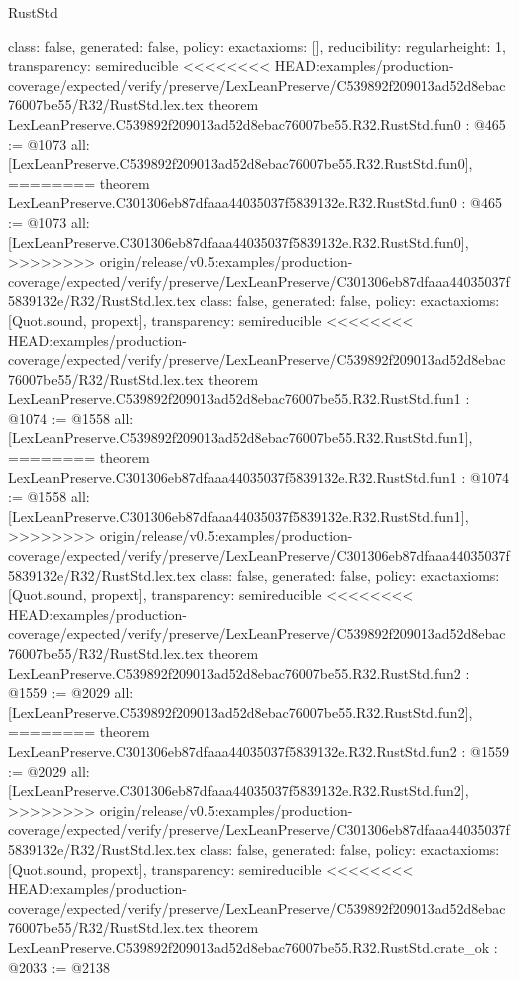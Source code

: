 \begin{lexlean}{RustStd}
\begin{coremodule}
{\begin{coremodule}
{{{  class: false,
  generated: false,
  policy: exact{axioms: []},
  reducibility: regular{height: 1},
  transparency: semireducible
}
<<<<<<<< HEAD:examples/production-coverage/expected/verify/preserve/LexLeanPreserve/C539892f209013ad52d8ebac76007be55/R32/RustStd.lex.tex
theorem LexLeanPreserve.C539892f209013ad52d8ebac76007be55.R32.RustStd.fun0 : @465 := @1073 {
  all: [LexLeanPreserve.C539892f209013ad52d8ebac76007be55.R32.RustStd.fun0],
========
theorem LexLeanPreserve.C301306eb87dfaaa44035037f5839132e.R32.RustStd.fun0 : @465 := @1073 {
  all: [LexLeanPreserve.C301306eb87dfaaa44035037f5839132e.R32.RustStd.fun0],
>>>>>>>> origin/release/v0.5:examples/production-coverage/expected/verify/preserve/LexLeanPreserve/C301306eb87dfaaa44035037f5839132e/R32/RustStd.lex.tex
  class: false,
  generated: false,
  policy: exact{axioms: [Quot.sound, propext]},
  transparency: semireducible
}
<<<<<<<< HEAD:examples/production-coverage/expected/verify/preserve/LexLeanPreserve/C539892f209013ad52d8ebac76007be55/R32/RustStd.lex.tex
theorem LexLeanPreserve.C539892f209013ad52d8ebac76007be55.R32.RustStd.fun1 : @1074 := @1558 {
  all: [LexLeanPreserve.C539892f209013ad52d8ebac76007be55.R32.RustStd.fun1],
========
theorem LexLeanPreserve.C301306eb87dfaaa44035037f5839132e.R32.RustStd.fun1 : @1074 := @1558 {
  all: [LexLeanPreserve.C301306eb87dfaaa44035037f5839132e.R32.RustStd.fun1],
>>>>>>>> origin/release/v0.5:examples/production-coverage/expected/verify/preserve/LexLeanPreserve/C301306eb87dfaaa44035037f5839132e/R32/RustStd.lex.tex
  class: false,
  generated: false,
  policy: exact{axioms: [Quot.sound, propext]},
  transparency: semireducible
}
<<<<<<<< HEAD:examples/production-coverage/expected/verify/preserve/LexLeanPreserve/C539892f209013ad52d8ebac76007be55/R32/RustStd.lex.tex
theorem LexLeanPreserve.C539892f209013ad52d8ebac76007be55.R32.RustStd.fun2 : @1559 := @2029 {
  all: [LexLeanPreserve.C539892f209013ad52d8ebac76007be55.R32.RustStd.fun2],
========
theorem LexLeanPreserve.C301306eb87dfaaa44035037f5839132e.R32.RustStd.fun2 : @1559 := @2029 {
  all: [LexLeanPreserve.C301306eb87dfaaa44035037f5839132e.R32.RustStd.fun2],
>>>>>>>> origin/release/v0.5:examples/production-coverage/expected/verify/preserve/LexLeanPreserve/C301306eb87dfaaa44035037f5839132e/R32/RustStd.lex.tex
  class: false,
  generated: false,
  policy: exact{axioms: [Quot.sound, propext]},
  transparency: semireducible
}
<<<<<<<< HEAD:examples/production-coverage/expected/verify/preserve/LexLeanPreserve/C539892f209013ad52d8ebac76007be55/R32/RustStd.lex.tex
theorem LexLeanPreserve.C539892f209013ad52d8ebac76007be55.R32.RustStd.crate_ok : @2033 := @2138 {
}}}}}}
\end{coremodule}}
\end{coremodule}
\end{lexlean}
